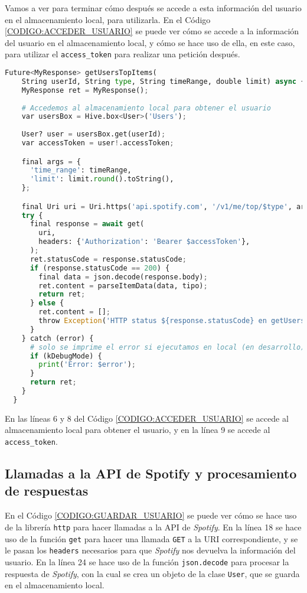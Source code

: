 Vamos a ver para terminar cómo después se accede a esta información del usuario en el almacenamiento local, para utilizarla.
En el Código \ref{CODIGO:ACCEDER_USUARIO} se puede ver cómo se accede a la información del usuario en el almacenamiento local, y 
cómo se hace uso de ella, en este caso, para utilizar el \texttt{access\_token} para realizar una petición después.

\begin{lstlisting}[language=python, caption=Acceder a la información del usuario, label=CODIGO:ACCEDER_USUARIO]
  Future<MyResponse> getUsersTopItems(
    String userId, String type, String timeRange, double limit) async {
    MyResponse ret = MyResponse();
    
    # Accedemos al almacenamiento local para obtener el usuario
    var usersBox = Hive.box<User>('Users');
    
    User? user = usersBox.get(userId);
    var accessToken = user!.accessToken;

    final args = {
      'time_range': timeRange,
      'limit': limit.round().toString(),
    };

    final Uri uri = Uri.https('api.spotify.com', '/v1/me/top/$type', args);
    try {
      final response = await get(
        uri,
        headers: {'Authorization': 'Bearer $accessToken'},
      );
      ret.statusCode = response.statusCode;
      if (response.statusCode == 200) {
        final data = json.decode(response.body);
        ret.content = parseItemData(data, tipo);
        return ret;
      } else {
        ret.content = [];
        throw Exception('HTTP status ${response.statusCode} en getUsersTopItems');
      }
    } catch (error) {
      # solo se imprime el error si ejecutamos en local (en desarrollo)
      if (kDebugMode) {
        print('Error: $error');
      }
      return ret;
    }
  }
\end{lstlisting}

En las líneas 6 y 8 del Código \ref{CODIGO:ACCEDER_USUARIO} se accede al almacenamiento local para obtener el usuario, y en la línea 9 
se accede al \texttt{access\_token}.

\subsection{Llamadas a la API de Spotify y procesamiento de respuestas\label{SEC:API_SPOTIFY_IMPLEMENTACION}}

En el Código \ref{CODIGO:GUARDAR_USUARIO} se puede ver cómo se hace uso de la librería \texttt{http} para hacer llamadas a la API de \textit{Spotify}.
En la línea 18 se hace uso de la función \texttt{get} para hacer una llamada \texttt{GET} a la URI correspondiente, y se le pasan
los \texttt{headers} necesarios para que \textit{Spotify} nos devuelva la información del usuario. En la línea 24 se hace uso de la función \texttt{json.decode}
para procesar la respuesta de \textit{Spotify}, con la cual se crea un objeto de la clase \texttt{User}, que se guarda en el almacenamiento local.

